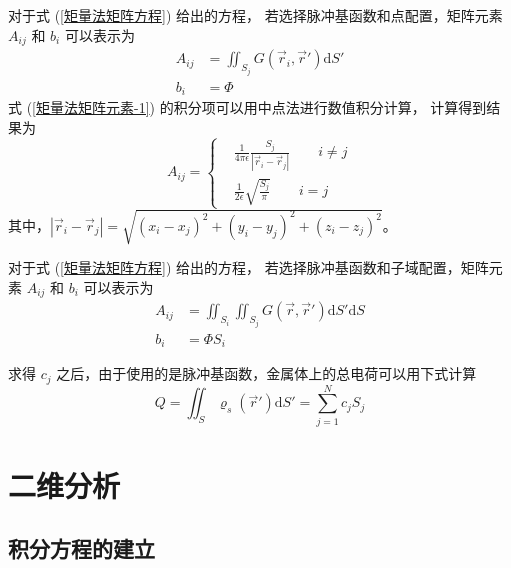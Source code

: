 \begin{theorem}
    对于式 (\ref{矩量法矩阵方程}) 给出的方程，
    若选择脉冲基函数和点配置，矩阵元素 $A_{ij}$ 和 $b_i$ 可以表示为
    \begin{align}
        \label{矩量法矩阵元素-1}
        A_{ij} &= \iint_{S_j} G(\vec{r}_i, \vec{r}') \text{d}S'\\
        b_i &= \Phi
    \end{align}
    式 (\ref{矩量法矩阵元素-1}) 的积分项可以用中点法进行数值积分计算，
    计算得到结果为
    \begin{equation}
        A_{ij} = 
        \left\{
            \begin{aligned}
                &\frac{1}{4\pi\epsilon}\frac{S_j}{\left|
                    \vec{r}_i-\vec{r}_j
                \right|} \qquad i \neq j \\
                &\frac{1}{2\epsilon}
                \sqrt{\frac{S_j}{\pi}} \qquad i = j
            \end{aligned}
        \right.
    \end{equation}
    其中，$\left|
        \vec{r}_i-\vec{r}_j
    \right|=\sqrt{(x_i-x_j)^2+(y_i-y_j)^2+(z_i-z_j)^2}$。
\end{theorem}

\begin{theorem}
    对于式 (\ref{矩量法矩阵方程}) 给出的方程，
    若选择脉冲基函数和子域配置，矩阵元素 $A_{ij}$ 和 $b_i$ 可以表示为
    \begin{align}
        A_{ij} &= 
        \iint_{S_i}
        \iint_{S_j} G(\vec{r}, \vec{r}') 
        \text{d}S' \text{d}S\\
        b_i &= \Phi S_i
    \end{align}
\end{theorem}

\par 求得 $c_j$ 之后，由于使用的是脉冲基函数，金属体上的总电荷可以用下式计算
\begin{equation}
    Q = \iint_{S} \varrho_s(\vec{r}') \text{d}S'
    =\sum_{j=1}^{N} c_j S_j
\end{equation}

\section{二维分析}

\subsection{积分方程的建立}

